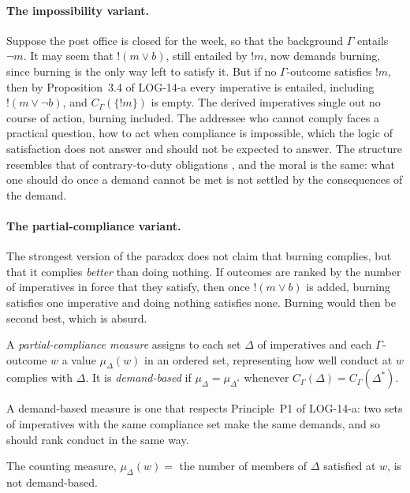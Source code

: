 \documentclass{situationist-preprint}
\begin{document}
\paragraph{The impossibility variant.} Suppose the post office is closed for the week, so that the background $\Gamma$ entails $\neg m$. It may seem that $!(m \vee b)$, still entailed by $!m$, now demands burning, since burning is the only way left to satisfy it. But if no $\Gamma$-outcome satisfies $!m$, then by Proposition~3.4 of LOG-14-a every imperative is entailed, including $!(m \vee \neg b)$, and $C_\Gamma(\{!m\})$ is empty. The derived imperatives single out no course of action, burning included. The addressee who cannot comply faces a practical question, how to act when compliance is impossible, which the logic of satisfaction does not answer and should not be expected to answer. The structure resembles that of contrary-to-duty obligations \citep{Chisholm1963}, and the moral is the same: what one should do once a demand cannot be met is not settled by the consequences of the demand.

\paragraph{The partial-compliance variant.} The strongest version of the paradox does not claim that burning complies, but that it complies \emph{better} than doing nothing. If outcomes are ranked by the number of imperatives in force that they satisfy, then once $!(m \vee b)$ is added, burning satisfies one imperative and doing nothing satisfies none. Burning would then be second best, which is absurd.

\begin{definition}\label{d:measure}
A \emph{partial-compliance measure} assigns to each set $\Delta$ of imperatives and each $\Gamma$-outcome $w$ a value $\mu_\Delta(w)$ in an ordered set, representing how well conduct at $w$ complies with $\Delta$. It is \emph{demand-based} if $\mu_\Delta = \mu_{\Delta^*}$ whenever $C_\Gamma(\Delta) = C_\Gamma(\Delta^*)$.
\end{definition}

A demand-based measure is one that respects Principle~P1 of LOG-14-a: two sets of imperatives with the same compliance set make the same demands, and so should rank conduct in the same way.

\begin{proposition}\label{p:counting}
The counting measure, $\mu_\Delta(w) =$ the number of members of $\Delta$ satisfied at $w$, is not demand-based.
\end{proposition}
\end{document}
